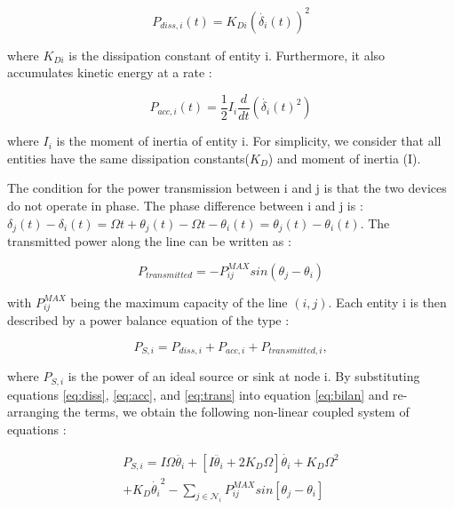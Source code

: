 \documentclass[conference]{IEEEtran}
\begin{document}
\begin{equation}
\label{eq:diss}
  P_{diss, i}(t) = K_{Di}(\dot{\delta_i}(t))^2 
\end{equation}

\noindent where $ K_{Di} $ is the dissipation constant of entity i. Furthermore, it also accumulates kinetic energy at a rate : 

\begin{equation} 
\label{eq:acc}
P_{acc,i}(t) = \frac{1}{2}I_i\frac{d}{dt} \left( \dot{ \delta_i }(t)^2 \right)
\end{equation} 

\noindent where $ I_{i}$ is the moment of inertia of entity i. For simplicity, we consider that all entities have the same dissipation constants($K_D$) and moment of inertia (I).

The condition for the power transmission between i and j is that the two devices do not operate in phase. The phase difference between i and j is : $ \delta_j(t) - \delta_i(t) = \Omega t + \theta_j(t) - \Omega t - \theta_i(t) = \theta_j(t) - \theta_i(t) $. The transmitted power along the line can be written as : 

\begin{equation}
\label{eq:trans}
 P_{transmitted} = - P_{ij}^{MAX} sin( \theta_j - \theta_i )
\end{equation}
  
\noindent with $ P_{ij}^{MAX} $ being the maximum capacity of the line $(i,j)$. Each entity i is then described by a power balance equation of the type :

\begin{equation}
\label{eq:bilan}
 P_{S,i}  =  P_{diss,i} + P_{acc,i} + P_{transmitted,i},
\end{equation}

\noindent where $ P_{S,i} $ is the power of an ideal source or sink at node i. By substituting equations \ref{eq:diss}, \ref{eq:acc}, and \ref{eq:trans} into equation \ref{eq:bilan} and re-arranging the terms, we obtain the following non-linear coupled system of equations :

\begin{equation}
\label{eq:without_simplification}
\begin{array}{lll}
P_{S, i}  =  I \Omega \ddot{ \theta_i }  + \left[ I \ddot{ \theta_i } + 2 K_D \Omega \right] \dot{ \theta_i } + K_D \Omega^2 \\+ K_D \dot{ \theta_i }^2 - \sum_{j \in \mathcal{N}_i} P_{ij}^{MAX} sin \left[ \theta_j - \theta_i \right] \end{array}
\end{equation}
\end{document}
